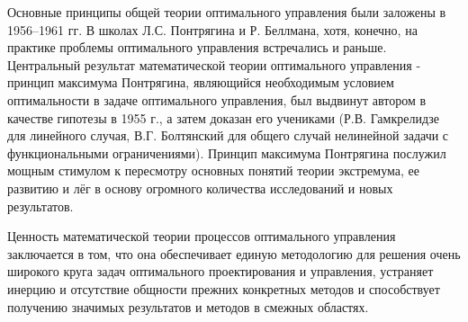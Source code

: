 Основные принципы общей теории оптимального управления были заложены в 1956–1961 гг. В школах Л.С. Понтрягина и Р. Беллмана, хотя, конечно, на практике проблемы оптимального управления встречались и раньше. Центральный результат математической теории оптимального управления - принцип максимума Понтрягина, являющийся необходимым условием оптимальности в задаче оптимального управления, был выдвинут автором в качестве гипотезы в 1955 г., а затем доказан его учениками (Р.В. Гамкрелидзе для линейного случая, В.Г. Болтянский для общего случай нелинейной задачи с функциональными ограничениями). Принцип максимума Понтрягина послужил мощным стимулом к пересмотру основных понятий теории экстремума, ее развитию и лёг в основу огромного количества исследований и новых результатов.



Ценность математической теории процессов оптимального управления заключается в том, что она обеспечивает единую методологию для решения очень широкого круга задач оптимального проектирования и управления, устраняет инерцию и отсутствие общности прежних конкретных методов и способствует получению значимых результатов и методов  в смежных областях. 
